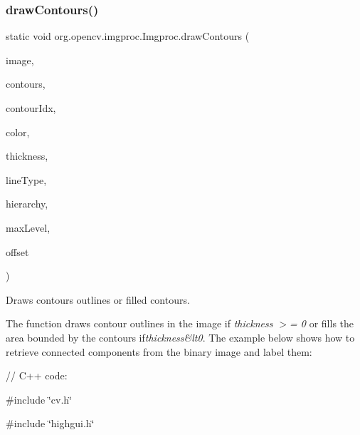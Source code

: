 \subsubsection{\texorpdfstring{draw\+Contours()}{drawContours()}\hspace{0.1cm}{\footnotesize\ttfamily [1/3]}}
{\footnotesize\ttfamily static void org.\+opencv.\+imgproc.\+Imgproc.\+draw\+Contours (\begin{DoxyParamCaption}\item[{\mbox{\hyperlink{classorg_1_1opencv_1_1core_1_1_mat}{Mat}}}]{image,  }\item[{List$<$ \mbox{\hyperlink{classorg_1_1opencv_1_1core_1_1_mat_of_point}{Mat\+Of\+Point}} $>$}]{contours,  }\item[{int}]{contour\+Idx,  }\item[{\mbox{\hyperlink{classorg_1_1opencv_1_1core_1_1_scalar}{Scalar}}}]{color,  }\item[{int}]{thickness,  }\item[{int}]{line\+Type,  }\item[{\mbox{\hyperlink{classorg_1_1opencv_1_1core_1_1_mat}{Mat}}}]{hierarchy,  }\item[{int}]{max\+Level,  }\item[{\mbox{\hyperlink{classorg_1_1opencv_1_1core_1_1_point}{Point}}}]{offset }\end{DoxyParamCaption})\hspace{0.3cm}{\ttfamily [static]}}

Draws contours outlines or filled contours.

The function draws contour outlines in the image if {\itshape thickness $>$= 0} or fills the area bounded by the contours if{\itshape thickness\&lt0}. The example below shows how to retrieve connected components from the binary image and label them\+: {\ttfamily }

{\ttfamily }

{\ttfamily }

{\ttfamily // C++ code\+:}

{\ttfamily }

{\ttfamily }

{\ttfamily \#include \char`\"{}cv.\+h\char`\"{}}

{\ttfamily }

{\ttfamily }

{\ttfamily \#include \char`\"{}highgui.\+h\char`\"{}}

{\ttfamily }

{\ttfamily }

